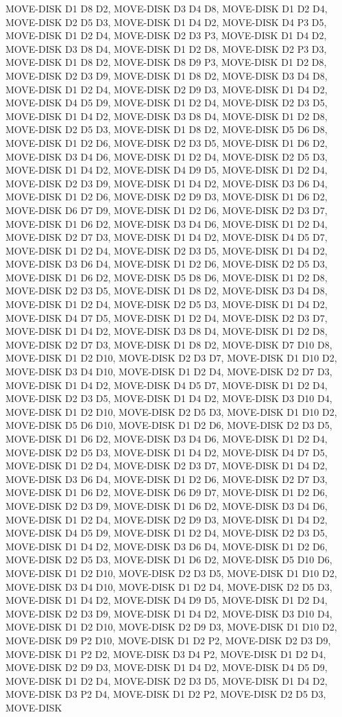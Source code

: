 \documentclass[12pt]{article}
\begin{document}
\begin{appendix}
\begin{itemize}
MOVE-DISK D1 D8 D2,  MOVE-DISK D3 D4 D8,  MOVE-DISK D1 D2 D4,  MOVE-DISK D2 D5 D3,  MOVE-DISK D1 D4 D2,  MOVE-DISK D4 P3 D5,  MOVE-DISK D1 D2 D4,  MOVE-DISK D2 D3 P3,  MOVE-DISK D1 D4 D2,  MOVE-DISK D3 D8 D4,  MOVE-DISK D1 D2 D8,  MOVE-DISK D2 P3 D3,  MOVE-DISK D1 D8 D2,  MOVE-DISK D8 D9 P3,  MOVE-DISK D1 D2 D8,  MOVE-DISK D2 D3 D9,  MOVE-DISK D1 D8 D2,  MOVE-DISK D3 D4 D8,  MOVE-DISK D1 D2 D4,  MOVE-DISK D2 D9 D3,  MOVE-DISK D1 D4 D2,  MOVE-DISK D4 D5 D9,  MOVE-DISK D1 D2 D4,  MOVE-DISK D2 D3 D5,  MOVE-DISK D1 D4 D2,  MOVE-DISK D3 D8 D4,  MOVE-DISK D1 D2 D8,  MOVE-DISK D2 D5 D3,  MOVE-DISK D1 D8 D2,  MOVE-DISK D5 D6 D8,  MOVE-DISK D1 D2 D6,  MOVE-DISK D2 D3 D5,  MOVE-DISK D1 D6 D2,  MOVE-DISK D3 D4 D6,  MOVE-DISK D1 D2 D4,  MOVE-DISK D2 D5 D3,  MOVE-DISK D1 D4 D2,  MOVE-DISK D4 D9 D5,  MOVE-DISK D1 D2 D4,  MOVE-DISK D2 D3 D9,  MOVE-DISK D1 D4 D2,  MOVE-DISK D3 D6 D4,  MOVE-DISK D1 D2 D6,  MOVE-DISK D2 D9 D3,  MOVE-DISK D1 D6 D2,  MOVE-DISK D6 D7 D9,  MOVE-DISK D1 D2 D6,  MOVE-DISK D2 D3 D7,  MOVE-DISK D1 D6 D2,  MOVE-DISK D3 D4 D6,  MOVE-DISK D1 D2 D4,  MOVE-DISK D2 D7 D3,  MOVE-DISK D1 D4 D2,  MOVE-DISK D4 D5 D7,  MOVE-DISK D1 D2 D4,  MOVE-DISK D2 D3 D5,  MOVE-DISK D1 D4 D2,  MOVE-DISK D3 D6 D4,  MOVE-DISK D1 D2 D6,  MOVE-DISK D2 D5 D3,  MOVE-DISK D1 D6 D2,  MOVE-DISK D5 D8 D6,  MOVE-DISK D1 D2 D8,  MOVE-DISK D2 D3 D5,  MOVE-DISK D1 D8 D2,  MOVE-DISK D3 D4 D8,  MOVE-DISK D1 D2 D4,  MOVE-DISK D2 D5 D3,  MOVE-DISK D1 D4 D2,  MOVE-DISK D4 D7 D5,  MOVE-DISK D1 D2 D4,  MOVE-DISK D2 D3 D7,  MOVE-DISK D1 D4 D2,  MOVE-DISK D3 D8 D4,  MOVE-DISK D1 D2 D8,  MOVE-DISK D2 D7 D3,  MOVE-DISK D1 D8 D2,  MOVE-DISK D7 D10 D8,  MOVE-DISK D1 D2 D10,  MOVE-DISK D2 D3 D7,  MOVE-DISK D1 D10 D2,  MOVE-DISK D3 D4 D10,  MOVE-DISK D1 D2 D4,  MOVE-DISK D2 D7 D3,  MOVE-DISK D1 D4 D2,  MOVE-DISK D4 D5 D7,  MOVE-DISK D1 D2 D4,  MOVE-DISK D2 D3 D5,  MOVE-DISK D1 D4 D2,  MOVE-DISK D3 D10 D4,  MOVE-DISK D1 D2 D10,  MOVE-DISK D2 D5 D3,  MOVE-DISK D1 D10 D2,  MOVE-DISK D5 D6 D10,  MOVE-DISK D1 D2 D6,  MOVE-DISK D2 D3 D5,  MOVE-DISK D1 D6 D2,  MOVE-DISK D3 D4 D6,  MOVE-DISK D1 D2 D4,  MOVE-DISK D2 D5 D3,  MOVE-DISK D1 D4 D2,  MOVE-DISK D4 D7 D5,  MOVE-DISK D1 D2 D4,  MOVE-DISK D2 D3 D7,  MOVE-DISK D1 D4 D2,  MOVE-DISK D3 D6 D4,  MOVE-DISK D1 D2 D6,  MOVE-DISK D2 D7 D3,  MOVE-DISK D1 D6 D2,  MOVE-DISK D6 D9 D7,  MOVE-DISK D1 D2 D6,  MOVE-DISK D2 D3 D9,  MOVE-DISK D1 D6 D2,  MOVE-DISK D3 D4 D6,  MOVE-DISK D1 D2 D4,  MOVE-DISK D2 D9 D3,  MOVE-DISK D1 D4 D2,  MOVE-DISK D4 D5 D9,  MOVE-DISK D1 D2 D4,  MOVE-DISK D2 D3 D5,  MOVE-DISK D1 D4 D2,  MOVE-DISK D3 D6 D4,  MOVE-DISK D1 D2 D6,  MOVE-DISK D2 D5 D3,  MOVE-DISK D1 D6 D2,  MOVE-DISK D5 D10 D6,  MOVE-DISK D1 D2 D10,  MOVE-DISK D2 D3 D5,  MOVE-DISK D1 D10 D2,  MOVE-DISK D3 D4 D10,  MOVE-DISK D1 D2 D4,  MOVE-DISK D2 D5 D3,  MOVE-DISK D1 D4 D2,  MOVE-DISK D4 D9 D5,  MOVE-DISK D1 D2 D4,  MOVE-DISK D2 D3 D9,  MOVE-DISK D1 D4 D2,  MOVE-DISK D3 D10 D4,  MOVE-DISK D1 D2 D10,  MOVE-DISK D2 D9 D3,  MOVE-DISK D1 D10 D2,  MOVE-DISK D9 P2 D10,  MOVE-DISK D1 D2 P2,  MOVE-DISK D2 D3 D9,  MOVE-DISK D1 P2 D2,  MOVE-DISK D3 D4 P2,  MOVE-DISK D1 D2 D4,  MOVE-DISK D2 D9 D3,  MOVE-DISK D1 D4 D2,  MOVE-DISK D4 D5 D9,  MOVE-DISK D1 D2 D4,  MOVE-DISK D2 D3 D5,  MOVE-DISK D1 D4 D2,  MOVE-DISK D3 P2 D4,  MOVE-DISK D1 D2 P2,  MOVE-DISK D2 D5 D3,  MOVE-DISK 
\end{itemize}
\end{appendix}
\end{document}
